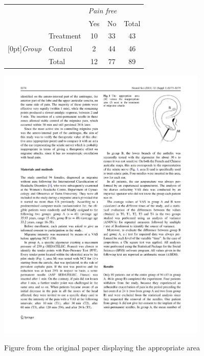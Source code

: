 {\noindent\begin{minipage}[l]{0.4\textwidth}
\begin{tabular}{ll  cc c} 
			                         		&           & \multicolumn{2}{c}{\textit{Pain free}} \\
\cline{3-4}
			                        	 	&			& Yes 	& No 	                  & Total \\
\cline{2-5}
							& Treatment 	& 10	 	& 33		                  & 43 \\
\raisebox{1.5ex}[0pt]{\emph{Group}} & Control	 	& 2	 	& 44 	 	                  & 46 \\
\cline{2-5}
							& Total		& 12		& 77		                  & 89
\end{tabular}
\end{minipage}
\begin{minipage}[c]{0.05\textwidth}
\end{minipage}
\begin{minipage}[c]{0.27\textwidth}
\begin{center}
\includegraphics[width = 0.75\textwidth]{ch_data_collection/figures/eoce/migraine_and_acupuncture_intro/earacupuncture.pdf}
\end{center}
\end{minipage}
\begin{minipage}[c]{0.25\textwidth}
{\footnotesize Figure from the original paper displaying the appropriate area 
}
\end{minipage}}
